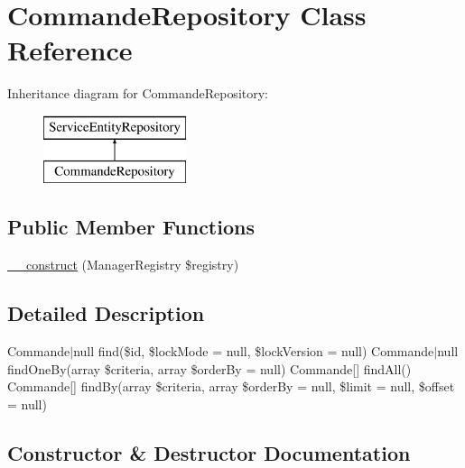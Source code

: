 \hypertarget{class_app_1_1_repository_1_1_commande_repository}{}\section{Commande\+Repository Class Reference}
\label{class_app_1_1_repository_1_1_commande_repository}
Inheritance diagram for Commande\+Repository\+:\begin{figure}[H]
\begin{center}
\leavevmode
\includegraphics[height=2.000000cm]{class_app_1_1_repository_1_1_commande_repository}
\end{center}
\end{figure}
\subsection*{Public Member Functions}
\begin{DoxyCompactItemize}
\item 
\mbox{\hyperlink{class_app_1_1_repository_1_1_commande_repository_a38ea33dde11163765f358f5f10a3bc03}{\+\_\+\+\_\+construct}} (Manager\+Registry \$registry)
\end{DoxyCompactItemize}


\subsection{Detailed Description}
Commande$\vert$null find(\$id, \$lock\+Mode = null, \$lock\+Version = null)  Commande$\vert$null find\+One\+By(array \$criteria, array \$order\+By = null)  Commande\mbox{[}\mbox{]} find\+All()  Commande\mbox{[}\mbox{]} find\+By(array \$criteria, array \$order\+By = null, \$limit = null, \$offset = null) 

\subsection{Constructor \& Destructor Documentation}
\mbox{\label{class_app_1_1_repository_1_1_commande_repository_a38ea33dde11163765f358f5f10a3bc03}} 
